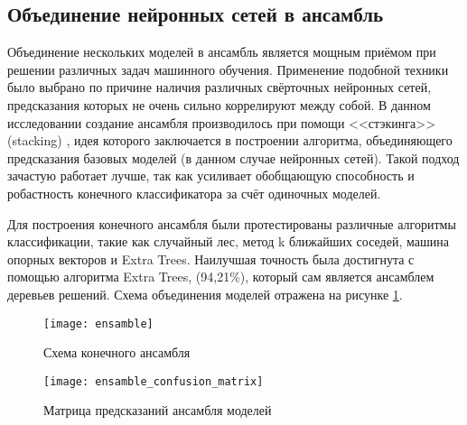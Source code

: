 \subsection{Объединение нейронных сетей в ансамбль}
Объединение нескольких моделей в ансамбль является мощным приёмом при решении различных задач машинного обучения.
Применение подобной техники было выбрано по причине наличия различных свёрточных нейронных сетей, предсказания которых
не очень сильно коррелируют между собой. В данном исследовании создание ансамбля производилось при помощи <<стэкинга>> (stacking)
\cite{Wolpert92stackedgeneralization}, идея которого заключается в построении алгоритма, объединяющего
предсказания базовых моделей (в данном случае нейронных сетей). Такой подход зачастую работает лучше, 
так как усиливает обобщающую способность и робастность конечного классификатора за счёт одиночных моделей.

Для построения конечного ансамбля были протестированы различные алгоритмы классификации, такие как случайный лес,
метод k ближайших соседей, машина опорных векторов и Extra Trees. Наилучшая точность была достигнута с 
помощью алгоритма Extra Trees,\cite{ExtraTrees} (94,21\%), который сам является ансамблем 
деревьев решений. Схема объединения моделей отражена на рисунке \ref{fig:ansamble}.

\begin{figure}[H]
    \centering
    \texttt{[image: ensamble]}
    \caption{Схема конечного ансамбля}
    \label{fig:ansamble}
\end{figure}

\begin{figure}[H]
    \centering
    \texttt{[image: ensamble\_confusion\_matrix]}
    \vspace*{-1.3cm}
    \caption{Матрица предсказаний ансамбля моделей}
    \label{fig:ensamble_confusion_matrix}
\end{figure}